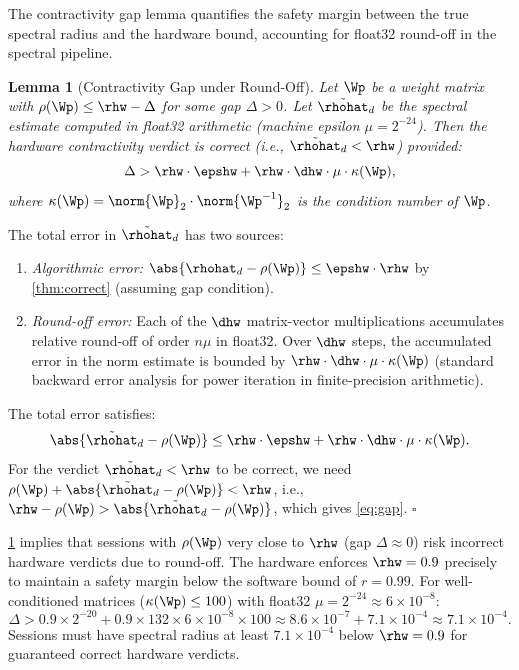 \documentclass[12pt,letterpaper]{article}
\theoremstyle{plain}
\newtheorem{lemma}[theorem]{Lemma}
\theoremstyle{definition}
\theoremstyle{remark}
\begin{document}
The contractivity gap lemma quantifies the safety margin between the true
spectral radius and the hardware bound, accounting for float32 round-off in
the spectral pipeline.

\begin{lemma}[Contractivity Gap under Round-Off]
\label{lem:gap}
Let \(\Wp\) be a weight matrix with \(\rho(\Wp) \leq \rhw - \Delta\)
for some gap \(\Delta > 0\). Let \(\tilde\rhohat_d\) be the spectral
estimate computed in float32 arithmetic (machine epsilon \(\mu = 2^{-24}\)).
Then the hardware contractivity verdict is correct (i.e.,
\(\tilde\rhohat_d < \rhw\)) provided:
\begin{equation}
  \Delta > \rhw \cdot \epshw + \rhw \cdot \dhw \cdot \mu \cdot \kappa(\Wp),
  \label{eq:gap}
\end{equation}
where \(\kappa(\Wp) = \norm{\Wp}_2 \cdot \norm{\Wp^{-1}}_2\) is the
condition number of \(\Wp\).
\end{lemma}

\begin{proofbox}
The total error in \(\tilde\rhohat_d\) has two sources:
\begin{enumerate}[noitemsep]
  \item \textit{Algorithmic error:} \(\abs{\rhohat_d - \rho(\Wp)} \leq \epshw \cdot \rhw\)
        by \cref{thm:correct} (assuming gap condition).
  \item \textit{Round-off error:} Each of the \(\dhw\) matrix-vector
        multiplications accumulates relative round-off of order \(n \mu\) in
        float32. Over \(\dhw\) steps, the accumulated error in the norm
        estimate is bounded by \(\rhw \cdot \dhw \cdot \mu \cdot \kappa(\Wp)\)
        (standard backward error analysis for power iteration in
        finite-precision arithmetic).
\end{enumerate}
The total error satisfies:
\[
  \abs{\tilde\rhohat_d - \rho(\Wp)}
  \leq \rhw \cdot \epshw + \rhw \cdot \dhw \cdot \mu \cdot \kappa(\Wp).
\]
For the verdict \(\tilde\rhohat_d < \rhw\) to be correct, we need
\(\rho(\Wp) + \abs{\tilde\rhohat_d - \rho(\Wp)} < \rhw\), i.e.,
\(\rhw - \rho(\Wp) > \abs{\tilde\rhohat_d - \rho(\Wp)}\), which gives
\cref{eq:gap}. \hfill\(\square\)
\end{proofbox}

\begin{hwbox}
\cref{lem:gap} implies that sessions with \(\rho(\Wp)\) very close to \(\rhw\)
(gap \(\Delta \approx 0\)) risk incorrect hardware verdicts due to round-off.
The hardware enforces \(\rhw = 0.9\) precisely to maintain a safety margin
below the software bound of \(r = 0.99\). For well-conditioned matrices
(\(\kappa(\Wp) \leq 100\)) with float32 \(\mu = 2^{-24} \approx 6 \times 10^{-8}\):
\[
  \Delta > 0.9 \times 2^{-20} + 0.9 \times 132 \times 6\times 10^{-8} \times 100
  \approx 8.6 \times 10^{-7} + 7.1 \times 10^{-4}
  \approx 7.1 \times 10^{-4}.
\]
Sessions must have spectral radius at least \(7.1 \times 10^{-4}\) below
\(\rhw = 0.9\) for guaranteed correct hardware verdicts.
\end{hwbox}
\end{document}
